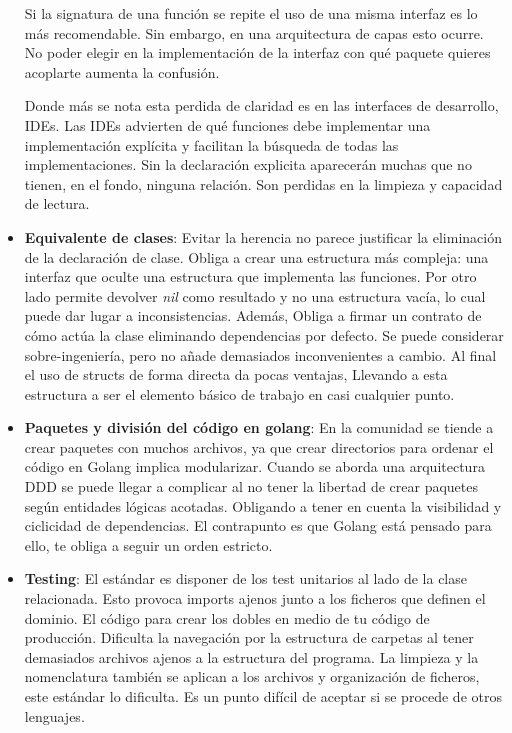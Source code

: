 \begin{itemize}
    Si la signatura de una función se repite el uso de una misma interfaz es lo más recomendable.
    Sin embargo, en una arquitectura de capas esto ocurre.
    No poder elegir en la implementación de la interfaz con qué paquete quieres acoplarte aumenta la confusión.

    Donde más se nota esta perdida de claridad es en las interfaces de desarrollo, IDEs.
    Las IDEs advierten de qué funciones debe implementar una implementación explícita y facilitan la búsqueda de todas las implementaciones.
    Sin la declaración explicita aparecerán muchas que no tienen, en el fondo, ninguna relación.
    Son perdidas en la limpieza y capacidad de lectura.

    \item \textbf{Equivalente de clases}: Evitar la herencia no parece justificar la eliminación de la declaración de clase.
    Obliga a crear una estructura más compleja: una interfaz que oculte una estructura que implementa las funciones.
    Por otro lado permite devolver \textit{nil} como resultado y no una estructura vacía, lo cual puede dar lugar a inconsistencias.
    Además, Obliga a firmar un contrato de cómo actúa la clase eliminando dependencias por defecto.
    Se puede considerar sobre-ingeniería, pero no añade demasiados inconvenientes a cambio.
    Al final el uso de structs de forma directa da pocas ventajas, Llevando a esta estructura a ser el elemento básico de trabajo en casi cualquier punto.

    \item \textbf{Paquetes y división del código en golang}: En la comunidad se tiende a crear paquetes con muchos archivos, ya que crear directorios para ordenar el código en Golang implica modularizar.
    Cuando se aborda una arquitectura DDD se puede llegar a complicar al no tener la libertad de crear paquetes según entidades lógicas acotadas.
    Obligando a tener en cuenta la visibilidad y ciclicidad de dependencias.
    El contrapunto es que Golang está pensado para ello, te obliga a seguir un orden estricto.

    \item \textbf{Testing}: El estándar es disponer de los test unitarios al lado de la clase relacionada.
    Esto provoca imports ajenos junto a los ficheros que definen el dominio.
    El código para crear los dobles en medio de tu código de producción.
    Dificulta la navegación por la estructura de carpetas al tener demasiados archivos ajenos a la estructura del programa.
    La limpieza y la nomenclatura también se aplican a los archivos y organización de ficheros, este estándar lo dificulta.
    Es un punto difícil de aceptar si se procede de otros lenguajes.
\end{itemize}

